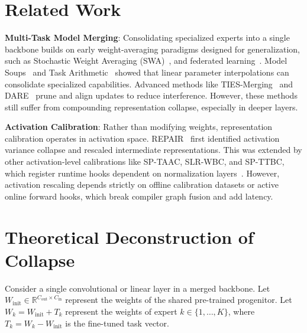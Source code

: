 \documentclass{article}
\begin{document}
\section{Related Work}
\label{sec:related}
\textbf{Multi-Task Model Merging}: Consolidating specialized experts into a single backbone builds on early weight-averaging paradigms designed for generalization, such as Stochastic Weight Averaging (SWA)~\cite{izmailov2018averaging}, and federated learning~\cite{mcmahan2017communication}. Model Soups~\cite{wortsman2022model} and Task Arithmetic~\cite{ilharco2022editing} showed that linear parameter interpolations can consolidate specialized capabilities. Advanced methods like TIES-Merging~\cite{yadav2023ties} and DARE~\cite{yu2023dare} prune and align updates to reduce interference. However, these methods still suffer from compounding representation collapse, especially in deeper layers.

\textbf{Activation Calibration}: Rather than modifying weights, representation calibration operates in activation space. REPAIR~\cite{jordan2023repair} first identified activation variance collapse and rescaled intermediate representations. This was extended by other activation-level calibrations like SP-TAAC, SLR-WBC, and SP-TTBC, which register runtime hooks dependent on normalization layers~\cite{ioffe2015batch, ba2016layer}. However, activation rescaling depends strictly on offline calibration datasets or active online forward hooks, which break compiler graph fusion and add latency.

\section{Theoretical Deconstruction of Collapse}
\label{sec:theory}
Consider a single convolutional or linear layer in a merged backbone. Let $W_{\text{init}} \in \mathbb{R}^{C_{\text{out}} \times C_{\text{in}}}$ represent the weights of the shared pre-trained progenitor. Let $W_k = W_{\text{init}} + T_k$ represent the weights of expert $k \in \{1, \dots, K\}$, where $T_k = W_k - W_{\text{init}}$ is the fine-tuned task vector.
\end{document}
